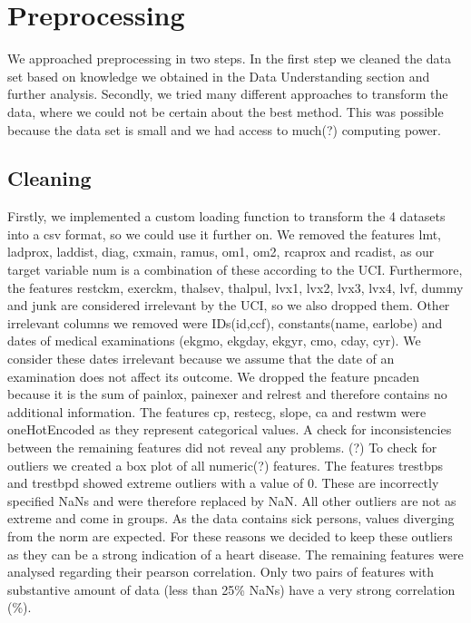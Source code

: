 \chapter{Preprocessing}
We approached preprocessing in two steps. In the first step we cleaned the data set based on knowledge we obtained in the Data Understanding section and further analysis. 
Secondly, we tried many different approaches to transform the data, where we could not be certain about the best method. This was possible because the data set is small and we had access to much(?) computing power.

\section{Cleaning}
Firstly, we implemented a custom loading function to transform the 4 datasets into a csv format, so we could use it further on.
We removed the features lmt, ladprox, laddist, diag, cxmain, ramus, om1, om2, rcaprox and rcadist, as our target variable num is a combination of these according to the UCI. %
Furthermore, the features restckm, exerckm, thalsev, thalpul, lvx1, lvx2, lvx3, lvx4, lvf, dummy and junk are considered irrelevant by the UCI, so we also dropped them. Other irrelevant columns we removed were IDs(id,ccf), constants(name, earlobe) and dates of medical examinations (ekgmo, ekgday, ekgyr, cmo, cday, cyr). We consider these dates irrelevant because we assume that the date of  an examination does not affect its outcome. 
We dropped the feature pncaden because it is the sum of painlox, painexer and relrest and therefore contains no additional information. 
The features cp, restecg, slope, ca and restwm were oneHotEncoded as they represent categorical values.
A check for inconsistencies between the remaining features did not reveal any problems. (?)
To check for outliers we created a box plot of all numeric(?) features. The features trestbps and trestbpd showed extreme outliers with a value of 0. These are incorrectly specified NaNs and were therefore replaced by NaN. All other outliers are not as extreme and come in groups. As the data contains sick persons, values diverging from the norm are expected. For these reasons we decided to keep these outliers as they can be a strong indication of a heart disease.
The remaining features were analysed regarding their pearson correlation. Only two pairs of features with substantive amount of data (less than 25\% NaNs) have a very strong correlation (\%).  
